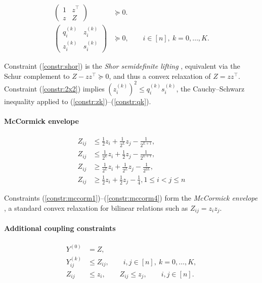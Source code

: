 \documentclass{article}
\begin{document}
\begin{align}
\begin{pmatrix}
1 & z^\top \\
z & Z
\end{pmatrix} &\succeq 0. \label{constr:shor} \\
\begin{pmatrix}
q_i^{(k)} & z_i^{(k)}\\
z_i^{(k)} & s_i^{(k)}
\end{pmatrix} &\succeq 0, \qquad i \in [n],\ k=0,\dots,K. \label{constr:2x2}
\end{align}

Constraint (\ref{constr:shor}) is the \emph{Shor semidefinite lifting}
\cite{ben2001lectures}, equivalent via the Schur complement
\cite{boyd2004convex} to $Z-zz^\top\succeq0$, and thus a convex
relaxation of $Z=zz^\top$. Constraint (\ref{constr:2x2}) implies
$(z_i^{(k)})^2\le q_i^{(k)}s_i^{(k)}$, the Cauchy--Schwarz
inequality applied to (\ref{constr:zk})--(\ref{constr:qk}).


\paragraph{McCormick envelope}
\begin{align}
Z_{ij} &\le  \frac{1}{2}z_i + \frac{1}{2^L} z_j - \frac{1}{2^{L+1}},\label{constr:mccorm1}\\
Z_{ij} &\le \frac{1}{2^L} z_i + \frac{1}{2} z_j - \frac{1}{2^{L+1}},\label{constr:mccorm2}\\
Z_{ij} &\ge \frac{1}{2^L} z_i + \frac{1}{2^L} z_j - \frac{1}{2^{2L}},\label{constr:mccorm3}\\
Z_{ij} &\ge \frac{1}{2} z_i + \frac{1}{2} z_j - \frac{1}{4}, 1\leq i<j\leq n \label{constr:mccorm4}
\end{align}

Constraints (\ref{constr:mccorm1})--(\ref{constr:mccorm4}) form the {\it McCormick envelope} \cite{mccormick1976computability},
a standard convex relaxation for bilinear relations such as $Z_{ij}=z_i z_j$.

\paragraph{Additional coupling constraints}

\begin{align}
Y^{(0)} &= Z, \label{constr:Z}\\
Y^{(k)}_{ij} &\le Z_{ij},
\qquad i,j\in[n],\ k=0,\dots,K, \label{constr:ineq1}\\
Z_{ij} &\le z_i,\qquad
Z_{ij}\le z_j,
\qquad i,j\in[n]. \label{constr:ineq2}
\end{align}
\end{document}
